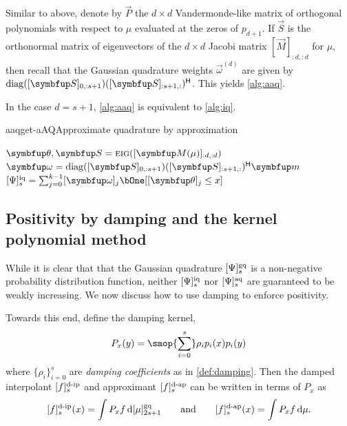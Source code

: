 Similar to above, denote by \( \vec{P} \) the \( d\times d \) Vandermonde-like matrix of orthogonal polynomials with respect to \( \mu \) evaluated at the zeros of \( p_{d+1} \).
If \( \vec{S} \) is the orthonormal matrix of eigenvectors of the \( d\times d \) Jacobi matrix \( [\vec{M}]_{:d,:d} \) for \( \mu \), then recall that the Gaussian quadrature weights \( \vec{\omega}^{(d)} \) are given by \( \operatorname{diag}([\vec{S}]_{0,:s+1})([\vec{S}]_{:s+1,:})^\cT \).
This yields \cref{alg:aaq}.

\begin{remark}
In the case \( d=s+1 \), \cref{alg:aaq} is equivalent to \cref{alg:iq}.
\end{remark}

\begin{labelalgorithm}[H]{aaq}{get-aAQ}{Approximate quadrature by approximation}
\begin{algorithmic}[1]
    \State \( \vec{\theta},\vec{S} = \Call{eig}{[\vec{M}(\mu)]_{:d,:d}} \) 
    \State \( \vec{\omega} = \operatorname{diag}([\vec{S}]_{0,:s+1})([\vec{S}]_{:s+1,:})^\cT \vec{m} \) 
    \State \Return \( \qq[i]{\Psi}{s} = \sum_{j=0}^{k-1} [\vec{\omega}]_{j} \bOne[[\vec{\theta}]_{j} \leq x]  \)
\EndProcedure
\end{algorithmic}
\end{labelalgorithm}



\subsection{Positivity by damping and the kernel polynomial method}
\label{sec:damped}

While it is clear that that the Gaussian quadrature \( \qq[g]{\Psi}{s} \) is a non-negative probability distribution function, neither \( \qq[i]{\Psi}{s} \) nor \( \qq[a]{\Psi}{s} \) are guaranteed to be weakly increasing.
We now discuss how to use damping to enforce positivity.

Towards this end, define the damping kernel,
\begin{equation*}
    P_x(y) 
    = \smop{\sum_{i=0}^{s}} \rho_{i} p_i(x) p_i(y)
\end{equation*}
where \( \{ \rho_i \}_{i=0}^{s} \) are \emph{damping coefficients} as in \cref{def:damping}.
Then the damped interpolant \( \ff[d-i]{f}{s} \) and approximant \( \ff[d-a]{f}{s} \) can be written in terms of \( P_{x} \) as 
\begin{equation*}
    \ff[d-i]{f}{s}(x) = \int P_{x} f \,\d\qq[g]{\mu}{2s+1}
    \qquad \text{and} \qquad
    \ff[d-a]{f}{s}(x) = \int P_{x} f \,\d\mu.
\end{equation*}

